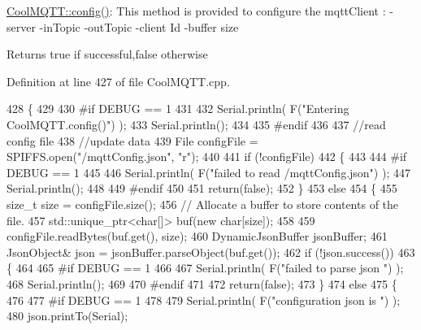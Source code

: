 \hyperlink{class_cool_m_q_t_t_a6571671781a505feca9a8a56e256c6bc}{Cool\+M\+Q\+T\+T\+::config()}\+: This method is provided to configure the mqtt\+Client \+: -\/server -\/in\+Topic -\/out\+Topic -\/client Id -\/buffer size

\begin{DoxyReturn}{Returns}
true if successful,false otherwise 
\end{DoxyReturn}


Definition at line 427 of file Cool\+M\+Q\+T\+T.\+cpp.


\begin{DoxyCode}
428 \{
429 
430 \textcolor{preprocessor}{#if DEBUG == 1 }
431 
432     Serial.println( F(\textcolor{stringliteral}{"Entering CoolMQTT.config()"}) );
433     Serial.println();
434 
435 \textcolor{preprocessor}{#endif}
436 
437     \textcolor{comment}{//read config file}
438     \textcolor{comment}{//update data}
439     File configFile = SPIFFS.open(\textcolor{stringliteral}{"/mqttConfig.json"}, \textcolor{stringliteral}{"r"});
440 
441     \textcolor{keywordflow}{if} (!configFile) 
442     \{
443     
444 \textcolor{preprocessor}{    #if DEBUG == 1 }
445 
446         Serial.println( F(\textcolor{stringliteral}{"failed to read /mqttConfig.json"}) );
447         Serial.println();
448 
449 \textcolor{preprocessor}{    #endif}
450 
451         \textcolor{keywordflow}{return}(\textcolor{keyword}{false});
452     \}
453     \textcolor{keywordflow}{else}
454     \{
455         \textcolor{keywordtype}{size\_t} size = configFile.size();
456         \textcolor{comment}{// Allocate a buffer to store contents of the file.}
457         std::unique\_ptr<char[]> buf(\textcolor{keyword}{new} \textcolor{keywordtype}{char}[size]);
458 
459         configFile.readBytes(buf.get(), size);
460         DynamicJsonBuffer jsonBuffer;
461         JsonObject& json = jsonBuffer.parseObject(buf.get());
462         \textcolor{keywordflow}{if} (!json.success()) 
463         \{
464         
465 \textcolor{preprocessor}{        #if DEBUG == 1 }
466 
467             Serial.println( F(\textcolor{stringliteral}{"failed to parse json "}) );
468             Serial.println();
469         
470 \textcolor{preprocessor}{        #endif}
471             
472             \textcolor{keywordflow}{return}(\textcolor{keyword}{false});
473         \} 
474         \textcolor{keywordflow}{else}
475         \{
476         
477 \textcolor{preprocessor}{        #if DEBUG == 1 }
478         
479             Serial.println( F(\textcolor{stringliteral}{"configuration json is "}) );
480             json.printTo(Serial);

\end{DoxyCode}
